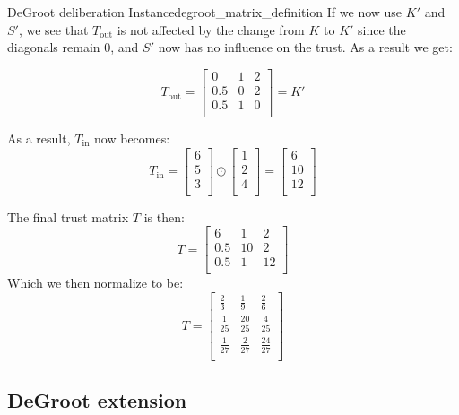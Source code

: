 \begin{example}{DeGroot deliberation Instance}{degroot_matrix_definition}
	If we now use $K'$ and $S'$, we see that $T_{\text{out}}$ is not
	affected by the change from $K$ to $K'$ since the diagonals remain 0,
	and $S'$ now has no influence on the trust. As a result we get:

	$$T_{\text{out}} = \begin{bmatrix}
			0   & 1 & 2 \\
			0.5 & 0 & 2 \\
			0.5 & 1 & 0 \\
		\end{bmatrix} = K'$$

	As a result, $T_{\text{in}}$ now becomes:
	$$T_{\text{in}} = \begin{bmatrix}
			6 \\
			5 \\
			3 \\
		\end{bmatrix} \odot
		\begin{bmatrix}
			1 \\
			2 \\
			4 \\
		\end{bmatrix} = \begin{bmatrix}
			6  \\
			10 \\
			12 \\
		\end{bmatrix} $$

	The final trust matrix $T$ is then:
	$$T = \begin{bmatrix}
			6   & 1  & 2  \\
			0.5 & 10 & 2  \\
			0.5 & 1  & 12 \\
		\end{bmatrix}$$
	Which we then normalize to be:
	$$T = \begin{bmatrix}
			\frac{2}{3}  & \frac{1}{9}   & \frac{2}{6}   \\
			\frac{1}{25} & \frac{20}{25} & \frac{4}{25}  \\
			\frac{1}{27} & \frac{2}{27}  & \frac{24}{27} \\
		\end{bmatrix}
	$$

\end{example}

\subsection{DeGroot extension}

